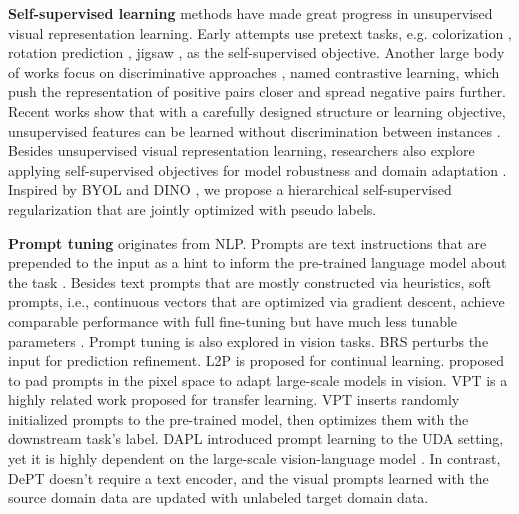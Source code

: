 \documentclass{article} \usepackage{iclr2023_conference,times}
\begin{document}
\textbf{Self-supervised learning} methods have made great progress in unsupervised visual representation learning. Early attempts use pretext tasks, e.g. colorization \citep{zhang2016colorful}, rotation prediction \citep{gidaris2018unsupervised}, jigsaw \citep{noroozi2016unsupervised}, as the self-supervised objective. Another large body of works focus on discriminative approaches \citep{chen2020simple,he2020momentum}, named contrastive learning, which push the representation of positive pairs closer and spread negative pairs further. Recent works show that with a carefully designed structure or learning objective, unsupervised features can be learned without discrimination between instances \citep{grill2020bootstrap,caron2021emerging}. Besides unsupervised visual representation learning, researchers also explore applying self-supervised objectives for model robustness \citep{hendrycks2019using} and domain adaptation \citep{sun2019unsupervised,sun2019test}. Inspired by BYOL \citep{grill2020bootstrap} and DINO \citep{caron2021emerging}, we propose a hierarchical self-supervised regularization that are jointly optimized with pseudo labels.


\textbf{Prompt tuning} originates from NLP. Prompts are text instructions that are prepended to the input as a hint to inform the pre-trained language model about the task \citep{brown2020language}. Besides text prompts that are mostly constructed via heuristics, soft prompts, i.e., continuous vectors that are optimized via gradient descent, achieve comparable performance with full fine-tuning but have much less tunable parameters \citep{li2021prefix,liu2021p}. Prompt tuning is also explored in vision tasks. BRS \citep{jang2019interactive} perturbs the input for prediction refinement. L2P \citep{wang2022learning} is proposed for continual learning. \citet{bahng2022exploring} proposed to pad prompts in the pixel space to adapt large-scale models in vision. VPT \citep{jia2022visual} is a highly related work proposed for transfer learning. VPT inserts randomly initialized prompts to the pre-trained model, then optimizes them with the downstream task's label. DAPL \citep{ge2022domain} introduced prompt learning to the UDA setting, yet it is highly dependent on the large-scale vision-language model \citep{radford2021learning}. In contrast, DePT doesn't require a text encoder, and the visual prompts learned with the source domain data are updated with unlabeled target domain data.
\end{document}

